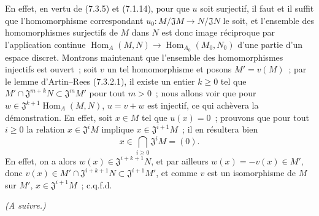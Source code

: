 En effet, en vertu de (7.3.5) et (7.1.14), pour que $u$ soit surjectif, il
faut et il suffit que l'homomorphisme correspondant
$u_0:M/\mathfrak JM\to N/\mathfrak JN$ le soit, et l'ensemble des
homomorphismes surjectifs de $M$ dans $N$ est donc image réciproque par
l'application continue $\operatorname{Hom}_A(M,N)\to\operatorname{Hom}_{A_0}(M_0,N_0)$ d'une partie
d'un espace discret. Montrons maintenant que l'ensemble des homomorphismes
injectifs est ouvert~; soit $v$ un tel homomorphisme et posons $M'=v(M)$~;
par le lemme d'Artin--Rees (7.3.2.1), il existe un entier $k\geq 0$ tel que
$M'\cap\mathfrak J^{m+k}N\subset\mathfrak J^mM'$ pour tout $m>0$~; nous
allons voir que pour $w\in\mathfrak J^{k+1}\operatorname{Hom}_A(M,N)$,
$u=v+w$ est injectif, ce qui achèvera la démonstration. En effet, soit
$x\in M$ tel que $u(x)=0$~; prouvons que pour tout $i\geq 0$ la relation
$x\in\mathfrak J^iM$ implique $x\in\mathfrak J^{i+1}M$~; il en résultera
bien
\[
  x\in\bigcap_{i\geq 0}\mathfrak J^iM=(0).
\]
En effet, on a alors $w(x)\in\mathfrak J^{i+k+1}N$, et par ailleurs
$w(x)=-v(x)\in M'$, donc
$v(x)\in M'\cap\mathfrak J^{i+k+1}N\subset\mathfrak J^{i+1}M'$, et comme
$v$ est un isomorphisme de $M$ sur $M'$, $x\in\mathfrak J^{i+1}M$~;
c.q.f.d.

\begin{flushright}
\emph{(A suivre.)}
\end{flushright}
